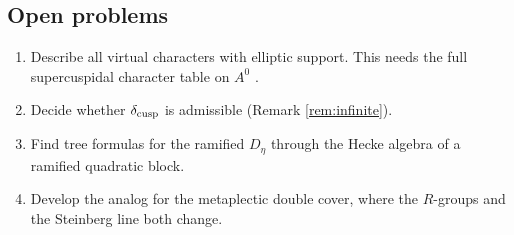 \subsection{Open problems}\label{sub:st-open}
\begin{enumerate}[label=\arabic*.,leftmargin=*]
\item Describe all virtual characters with elliptic support. This needs the full supercuspidal character table on $A^0$ \cite{SS68,ADSS11}.
\item Decide whether $\delta_{\rm cusp}$ is admissible (Remark \ref{rem:infinite}).
\item Find tree formulas for the ramified $D_\eta$ through the Hecke algebra of a ramified quadratic block.
\item Develop the analog for the metaplectic double cover, where the $R$-groups and the Steinberg line both change.
\end{enumerate}

